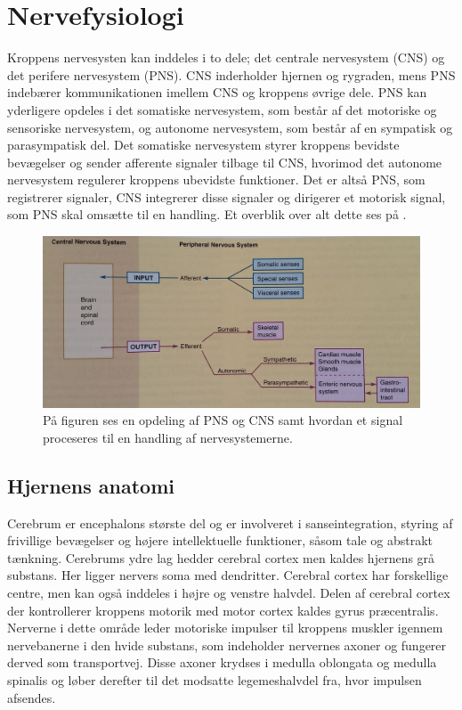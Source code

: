 \chapter{Nervefysiologi}\label{AppNerve}
Kroppens nervesysten kan inddeles i to dele; det centrale nervesystem (CNS) og det perifere nervesystem (PNS). CNS inderholder hjernen og rygraden, mens PNS indebærer kommunikationen imellem CNS og kroppens øvrige dele. PNS kan yderligere opdeles i det somatiske nervesystem, som består af det motoriske og sensoriske nervesystem, og autonome nervesystem, som består af en sympatisk og parasympatisk del. Det somatiske nervesystem styrer kroppens bevidste bevægelser og sender afferente signaler tilbage til CNS, hvorimod det autonome nervesystem regulerer kroppens ubevidste funktioner. Det er altså PNS, som registrerer signaler, CNS integrerer disse signaler og dirigerer et motorisk signal, som PNS skal omsætte til en handling. \cite{Martini2012,Stanfield2014} Et overblik over alt dette ses på .

\begin{figure}[H]
	\centering
	\includegraphics[scale=0.15]{figures/bProblemanalyse/Nervesys1.jpg}
	\caption{På figuren ses en opdeling af PNS og CNS samt hvordan et signal proceseres til en handling af nervesystemerne. \cite{Stanfield2014}}
	\label{Nersys}
\end{figure}

\section{Hjernens anatomi}
Cerebrum er encephalons største del og er involveret i sanseintegration, styring af frivillige bevægelser og højere intellektuelle funktioner, såsom tale og abstrakt tænkning. \cite{Academic2015b} Cerebrums ydre lag hedder cerebral cortex men kaldes hjernens grå substans. Her ligger nervers soma med dendritter. Cerebral cortex har forskellige centre, men kan også inddeles i højre og venstre halvdel. Delen af cerebral cortex der kontrollerer kroppens motorik med motor cortex kaldes gyrus præcentralis. Nerverne i dette område leder motoriske impulser til kroppens muskler igennem nervebanerne i den hvide substans, som indeholder nervernes axoner og fungerer derved som transportvej. \cite{Academic2015b,Martini2012,Stanfield2014} Disse axoner krydses i medulla oblongata og medulla spinalis og løber derefter til det modsatte legemeshalvdel fra, hvor impulsen afsendes. \cite{Martini2012}

